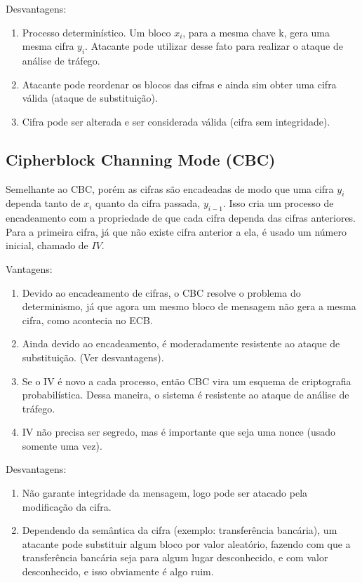 \documentclass[a4paper]{article}
\begin{document}
Desvantagens:

\begin{enumerate}
\item Processo determinístico. Um bloco $x_i$, para a mesma chave k, gera uma mesma cifra $y_i$. Atacante pode
utilizar desse fato para realizar o ataque de análise de tráfego.
\item Atacante pode reordenar os blocos das cifras e ainda sim obter uma cifra válida (ataque de substituição).
\item Cifra pode ser alterada e ser considerada válida (cifra sem integridade).
\end{enumerate}

\subsection{Cipherblock Channing Mode (CBC)}

Semelhante ao CBC, porém as cifras são encadeadas de modo que uma cifra $y_i$ dependa tanto de $x_i$ quanto da
cifra passada, $y_{i-1}$. Isso cria um processo de encadeamento com a propriedade de que cada cifra dependa
das cifras anteriores. Para a primeira cifra, já que não existe cifra anterior a ela, é usado um número inicial,
chamado de $IV$.

Vantagens:

\begin{enumerate}
\item Devido ao encadeamento de cifras, o CBC resolve o problema do determinismo, já que agora um mesmo bloco
de mensagem não gera a mesma cifra, como acontecia no ECB.
\item Ainda devido ao encadeamento, é moderadamente resistente ao ataque de substituição. (Ver desvantagens).
\item Se o IV é novo a cada processo, então CBC vira um esquema de criptografia probabilística. Dessa maneira,
o sistema é resistente ao ataque de análise de tráfego.
\item IV não precisa ser segredo, mas é importante que seja uma nonce (usado somente uma vez).
\end{enumerate}

Desvantagens:

\begin{enumerate}
\item Não garante integridade da mensagem, logo pode ser atacado pela modificação da cifra.
\item Dependendo da semântica da cifra (exemplo: transferência bancária), um atacante pode substituir algum bloco
por valor aleatório, fazendo com que a transferência bancária seja para algum lugar desconhecido, e com valor desconhecido, e
isso obviamente é algo ruim.
\end{enumerate}
\end{document}
